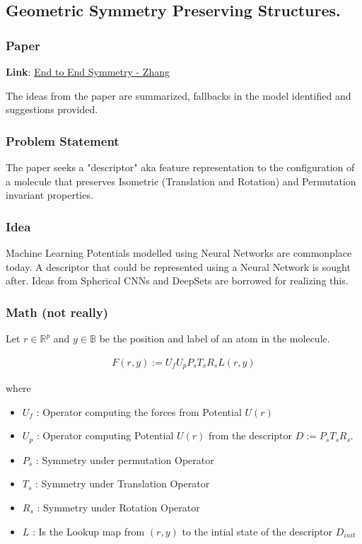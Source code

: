 \subsection{Geometric Symmetry Preserving Structures.}

\subsubsection{Paper}
\textbf{Link}: \href{https://arxiv.org/abs/1805.09003}{End to End Symmetry - Zhang} 

The ideas from the paper are summarized, fallbacks in the model identified
and suggestions provided. 

\subsubsection{Problem Statement}
The paper seeks a "descriptor" aka feature representation to the configuration of a 
molecule that preserves Isometric (Translation and Rotation) and Permutation invariant
properties. 

\subsubsection{Idea}
Machine Learning Potentials modelled using Neural Networks are commonplace today.
A descriptor that could be represented using a Neural Network is sought after.
Ideas from Spherical CNNs and DeepSets are borrowed for realizing this.

\subsubsection{Math (not really)}

Let $r \in \mathbb{R}^{p}$ and $y \in \mathbb{B}$ be the position and label of an atom in the molecule.

\begin{align*}
    F(r,y) := U_{f}U_{p}P_{s}T_{s}R_{s} L(r,y) 
\end{align*}

where \\ 
\begin{itemize}
    \item $U_{f}$ : Operator computing the forces from Potential $U(r)$
    \item $U_{p}$ : Operator computing Potential $U(r)$ from the descriptor $D := P_{s}T_{s}R_{s}$.
    \item $P_{s}$ : Symmetry under permutation Operator
    \item $T_{s}$ : Symmetry under Translation Operator
    \item $R_{s}$ : Symmetry under Rotation Operator
    \item $L$ : Is the Lookup map from $(r,y)$ to the intial state of the descriptor $D_{init}$
\end{itemize}


